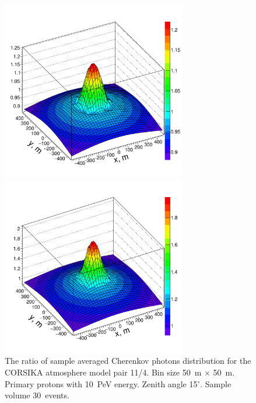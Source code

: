 \documentclass[universe,article,submit,moreauthors,pdftex]{Definitions/mdpi}
\begin{document}
\begin{figure}[tb]
    \begin{minipage}[t]{0.48\textwidth}
        \centering
        \includegraphics[width=19pc]{10PeV_pro_15deg_m11_over_m04}%
        \vspace{-1.0pc}
        \caption{The ratio of sample averaged Cherenkov photons distribution for the CORSIKA atmosphere model pair 11/4. Bin size 50~m $\times$ 50~m. Primary protons with 10~PeV energy. Zenith angle 15$^\circ$. Sample volume 30~events.}
        \label{fig:4d11}
    \end{minipage}
    \hfill
    \begin{minipage}[t]{0.48\textwidth}
        \centering
        \includegraphics[width=19pc]{10PeV_15deg_pro_over_Fe}%

\end{minipage}
\end{figure}
\end{document}
